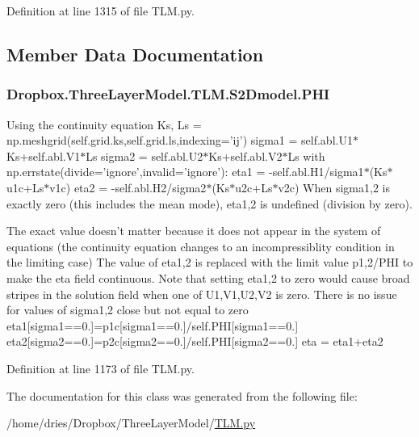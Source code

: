 Definition at line 1315 of file T\+L\+M.\+py.



\subsection{Member Data Documentation}
\hypertarget{classDropbox_1_1ThreeLayerModel_1_1TLM_1_1S2Dmodel_a8718f789428108d167d7174634a6c845}{
\subsubsection[{P\+H\+I}]{\setlength{\rightskip}{0pt plus 5cm}Dropbox.\+Three\+Layer\+Model.\+T\+L\+M.\+S2\+Dmodel.\+P\+H\+I}}\label{classDropbox_1_1ThreeLayerModel_1_1TLM_1_1S2Dmodel_a8718f789428108d167d7174634a6c845}


Using the continuity equation Ks, Ls = np.\+meshgrid(self.\+grid.\+ks,self.\+grid.\+ls,indexing='ij') sigma1 = self.\+abl.\+U1$\ast$\+Ks+self.abl.\+V1$\ast$\+Ls sigma2 = self.\+abl.\+U2$\ast$\+Ks+self.abl.\+V2$\ast$\+Ls with np.\+errstate(divide='ignore',invalid='ignore')\+: eta1 = -\/self.\+abl.\+H1/sigma1$\ast$(Ks$\ast$u1c+\+Ls$\ast$v1c) eta2 = -\/self.\+abl.\+H2/sigma2$\ast$(Ks$\ast$u2c+\+Ls$\ast$v2c) When sigma1,2 is exactly zero (this includes the mean mode), eta1,2 is undefined (division by zero). 

The exact value doesn't matter because it does not appear in the system of equations (the continuity equation changes to an incompressiblity condition in the limiting case) The value of eta1,2 is replaced with the limit value p1,2/\+P\+H\+I to make the eta field continuous. Note that setting eta1,2 to zero would cause broad stripes in the solution field when one of U1,V1,U2,V2 is zero. There is no issue for values of sigma1,2 close but not equal to zero eta1\mbox{[}sigma1==0.\mbox{]}=p1c\mbox{[}sigma1==0.\mbox{]}/self.P\+H\+I\mbox{[}sigma1==0.\mbox{]} eta2\mbox{[}sigma2==0.\mbox{]}=p2c\mbox{[}sigma2==0.\mbox{]}/self.P\+H\+I\mbox{[}sigma2==0.\mbox{]} eta = eta1+eta2 

Definition at line 1173 of file T\+L\+M.\+py.



The documentation for this class was generated from the following file\+:\begin{DoxyCompactItemize}
\item 
/home/dries/\+Dropbox/\+Three\+Layer\+Model/\hyperlink{TLM_8py}{T\+L\+M.\+py}\end{DoxyCompactItemize}
